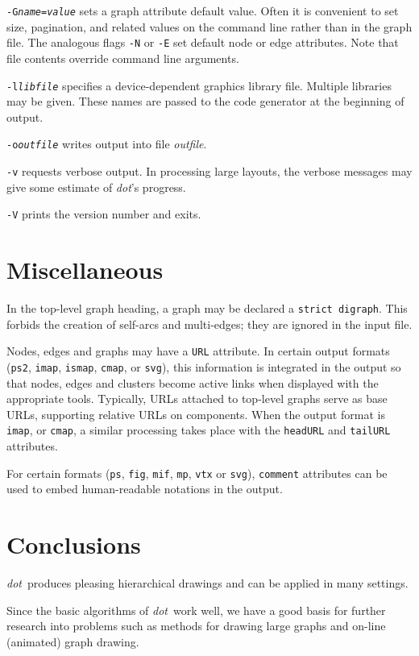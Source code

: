 \documentclass[11pt]{article}
\def\dot{{\it dot}}
\begin{document}
{\tt-G{\it name}={\it value}} sets a graph attribute default value.
Often it is convenient to set size, pagination, and related
values on the command line rather than in the graph file.
The analogous flags \verb"-N" or \verb"-E" 
set default node or edge attributes.
Note that file contents override command line arguments.

{\tt-l{\it libfile}} specifies a device-dependent graphics library
file. Multiple libraries may be given. These names are passed to the code
generator at the beginning of output. 

{\tt-o{\it outfile}} writes output into file {\it outfile}.

\verb"-v" requests verbose output.  In processing large layouts,
the verbose messages may give some estimate of \dot's progress.

\verb"-V" prints the version number and exits.

\section{Miscellaneous}

In the top-level graph heading, a graph may be declared a
{\tt strict digraph}.  This forbids the creation of self-arcs
and multi-edges; they are ignored in the input file.

Nodes, edges and graphs may have a {\tt URL} attribute. In certain
output formats ({\tt ps2}, {\tt imap}, {\tt ismap}, {\tt cmap}, or {\tt svg}), 
this information is integrated in the output 
so that nodes, edges and clusters become active links
when displayed with the appropriate tools. Typically, URLs attached to
top-level graphs serve as base URLs, supporting relative URLs on
components. When the output format is {\tt imap}, or {\tt cmap},
a similar processing
takes place with the {\tt headURL} and {\tt tailURL} attributes.

For certain formats ({\tt ps}, {\tt fig}, {\tt mif}, {\tt mp}, 
{\tt vtx} or {\tt svg}), {\tt comment} attributes can be used to
embed human-readable notations in the output.

\section{Conclusions}

\dot\ produces pleasing hierarchical drawings and can be
applied in many settings.

Since the basic algorithms of \dot\ work well, we have a good basis for
further research into problems such as methods for drawing large graphs
and on-line (animated) graph drawing.
\end{document}
